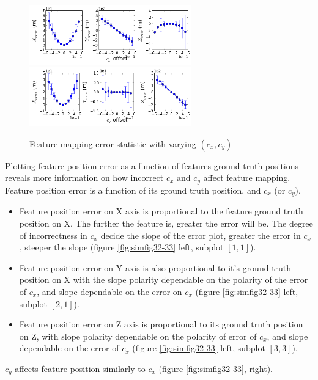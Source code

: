 \begin{figure}[h]
  \centering
  \includegraphics[width=7cm, keepaspectratio=true]{./Figures/SimulationFigures/Figure28.png}
  \includegraphics[width=7cm, keepaspectratio=true]{./Figures/SimulationFigures/Figure29.png}
  \caption{Feature mapping error statistic with varying $(c_x, c_y)$}
  \label{fig:simfig28-29}
\end{figure}

Plotting feature position error as a function of features ground truth positions reveals more information on how incorrect $c_{x}$ and $c_{y}$ affect feature mapping. Feature position error is a function of its ground truth position, and $c_{x}$ (or $c_{y}$).

\begin{itemize}
  \item Feature position error on X axis is proportional to the feature ground truth position on X. The further the feature is, greater the error will be. The degree of incorrectness in $c_{x}$ decide the slope of the error plot, greater the error in $c_{x}$, steeper the slope (figure \ref{fig:simfig32-33} left, subplot $[1,1]$).
  \item Feature position error on Y axis is also proportional to it's ground truth position on X with the slope polarity dependable on the polarity of the error of $c_{x}$, and slope dependable on the error on $c_{x}$ (figure \ref{fig:simfig32-33} left, subplot $[2,1]$).
  \item Feature position error on Z axis is proportional to its ground truth position on Z, with slope polarity dependable on the polarity of error of $c_{x}$, and slope dependable on the error of $c_{x}$ (figure \ref{fig:simfig32-33} left, subplot $[3,3]$).
\end{itemize}

$c_{y}$ affects feature position similarly to $c_{x}$ (figure \ref{fig:simfig32-33}, right).

